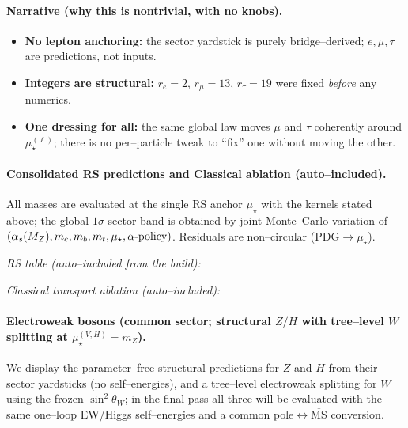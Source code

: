 \documentclass[epjc3]{svjour3}
\begin{document}
\paragraph{Narrative (why this is nontrivial, with no knobs).}
\begin{itemize}
  \item \textbf{No lepton anchoring:} the sector yardstick is purely bridge–derived; $e,\mu,\tau$ are predictions, not inputs.
  \item \textbf{Integers are structural:} $r_e=2$, $r_\mu=13$, $r_\tau=19$ were fixed \emph{before} any numerics.
  \item \textbf{One dressing for all:} the same global law moves $\mu$ and $\tau$ coherently around $\mu_\star^{(\ell)}$; there is no per–particle tweak to “fix” one without moving the other.
\end{itemize}

\paragraph{Consolidated RS predictions and Classical ablation (auto–included).}
All masses are evaluated at the single RS anchor $\mu_\star$ with the kernels stated above; the global $1\sigma$ sector band is obtained by joint Monte–Carlo variation of $(\alpha_s(M_Z), m_c,m_b,m_t,\mu_\star,\alpha\text{\rm-policy})$. Residuals are non–circular (PDG$\to\mu_\star$).

\medskip
\noindent\textit{RS table (auto–included from the build):}

\noindent\textit{Classical transport ablation (auto–included):}

\paragraph{Electroweak bosons (common sector; structural $Z/H$ with tree–level $W$ splitting at $\mu_\star^{(V,H)}=m_Z$).}
We display the parameter–free structural predictions for $Z$ and $H$ from their sector yardsticks (no self–energies), and a tree–level electroweak splitting for $W$ using the frozen $\sin^2\theta_W$; in the final pass all three will be evaluated with the same one–loop EW/Higgs self–energies and a common pole$\leftrightarrow\overline{\mathrm{MS}}$ conversion.
\end{document}
